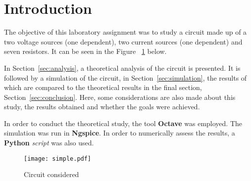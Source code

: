 \section{Introduction}
\label{sec:introduction}

The objective of this laboratory assignment was to study a circuit made up of a two voltage sources (one dependent), two current sources (one dependent) and seven resistors. It can be seen in the Figure ~\ref{circuit} below.

In Section~\ref{sec:analysis}, a theoretical analysis of the circuit is presented. It is followed by a simulation of the circuit, in Section~\ref{sec:simulation}, the results of which are compared to the theoretical results in the final section, Section~\ref{sec:conclusion}. Here, some  considerations are also made about this study, the results obtained and whether the goals were achieved.

In order to conduct the theoretical study, the tool {\bf Octave} was employed. The simulation was run in {\bf Ngspice}. In order to numerically assess the results, a {\bf Python} {\it script} was also used.


\begin{figure}[H]
  \centering
  \texttt{[image: simple.pdf]}
  \caption{Circuit considered}
  \label{circuit}
\end{figure}

